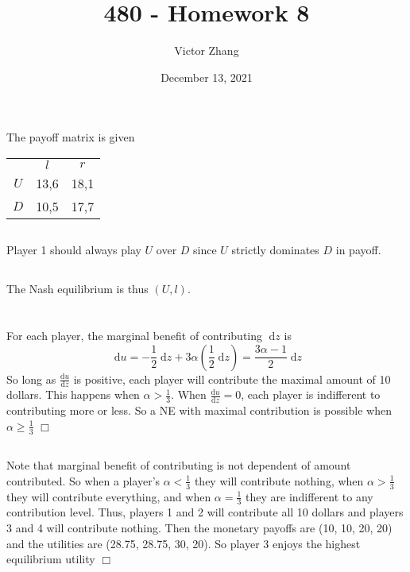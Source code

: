\documentclass{article}
\title{480 - Homework 8}
\author{Victor Zhang}
\date{December 13, 2021}
\begin{document}
\maketitle

\section{}
The payoff matrix is given
\begin{center}
\begin{tabular}{c c c}
 & $l$ & $r$\\
$U$ & 13,6 & 18,1\\
$D$ & 10,5 & 17,7
\end{tabular}
\end{center}

\subsection{}
Player 1 should always play $U$ over $D$ since $U$ strictly dominates $D$ in payoff.

\subsection{}
The Nash equilibrium is thus $(U,l)$.

\section{}
\subsection{}
For each player, the marginal benefit of contributing $\;\mathrm{d}z$ is
$$\;\mathrm{d}u = -\frac{1}{2}\;\mathrm{d}z + 3\alpha(\frac{1}{2}\;\mathrm{d}z) = \frac{3\alpha - 1}{2}\;\mathrm{d}z$$
So long as $\frac{\mathrm{d}u}{\mathrm{d}z}$ is positive, each player will contribute the maximal amount of 10 dollars. This happens when $\alpha > \tfrac{1}{3}$. When $\frac{\mathrm{d}u}{\mathrm{d}z} = 0$, each player is indifferent to contributing more or less. So a NE with maximal contribution is possible when $\alpha \geq \tfrac{1}{3}$ $\Box$

\subsection{}
Note that marginal benefit of contributing is not dependent of amount contributed. So when a player's $\alpha < \tfrac{1}{3}$ they will contribute nothing, when $\alpha > \tfrac{1}{3}$ they will contribute everything, and when $\alpha = \tfrac{1}{3}$ they are indifferent to any contribution level. Thus, players 1 and 2 will contribute all 10 dollars and players 3 and 4 will contribute nothing. Then the monetary payoffs are (10, 10, 20, 20) and the utilities are (28.75, 28.75, 30, 20). So player 3 enjoys the highest equilibrium utility $\Box$
\end{document}
